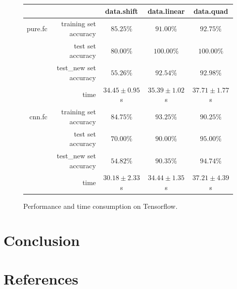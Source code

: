 \documentclass[a4paper]{article}
\begin{document}
\begin{figure}[H]
\centering
\begin{tabular}{|r|r|c|c|c|}
\hline
 & & data.shift & data.linear & data.quad \\
\hline
pure.fc & training set accuracy & $85.25\%$ & $91.00\%$ & $92.75\%$ \\
 & test set accuracy & $80.00\%$ & $100.00\%$ & $100.00\%$ \\
 & test\_new set accuracy & $55.26\%$ & $92.54\%$ & $92.98\%$ \\
 & time & $34.45\pm0.95$s & $35.39\pm1.02$s & $37.71\pm1.77$s \\
\hline
cnn.fc & training set accuracy & $84.75\%$ & $93.25\%$ & $90.25\%$ \\
 & test set accuracy & $70.00\%$ & $90.00\%$ & $95.00\%$ \\
 & test\_new set accuracy & $54.82\%$ & $90.35\%$ & $94.74\%$ \\
 & time & $30.18\pm2.33$s & $34.44\pm1.35$s & $37.21\pm4.39$s \\
\hline
\end{tabular}
\caption{Performance and time consumption on Tensorflow.}
\end{figure}

\section{Conclusion}

\section{References}



\end{document}
